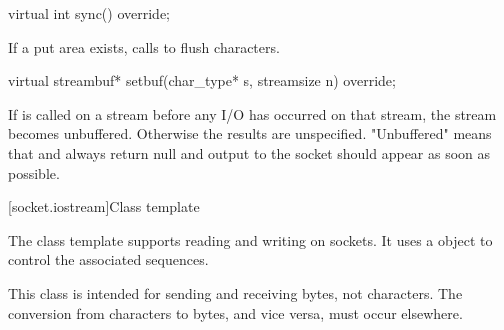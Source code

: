 \begin{itemdecl}
virtual int sync() override;
\end{itemdecl}

\begin{itemdescr}
\pnum
\effects If a put area exists, calls  to flush characters.
\end{itemdescr}

\begin{itemdecl}
virtual streambuf* setbuf(char_type* s, streamsize n) override;
\end{itemdecl}

\begin{itemdescr}
\pnum
\effects If  is called on a stream before any I/O has occurred on that stream, the stream becomes unbuffered. Otherwise the results are unspecified. "Unbuffered" means that  and  always return null and output to the socket should appear as soon as possible.
\end{itemdescr}




[socket.iostream]{Class template }

\pnum
The class template  supports reading and writing on sockets. It uses a  object to control the associated sequences.

\pnum
 \enternote This class is intended for sending and receiving bytes, not characters. The conversion from characters to bytes, and vice versa, must occur elsewhere. \exitnote

